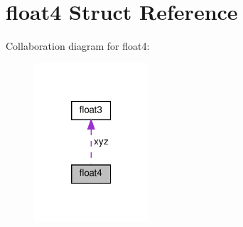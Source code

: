 \hypertarget{structfloat4}{}\section{float4 Struct Reference}
\label{structfloat4}


Collaboration diagram for float4\+:
\nopagebreak
\begin{figure}[H]
\begin{center}
\leavevmode
\includegraphics[width=121pt]{structfloat4__coll__graph}
\end{center}
\end{figure}
